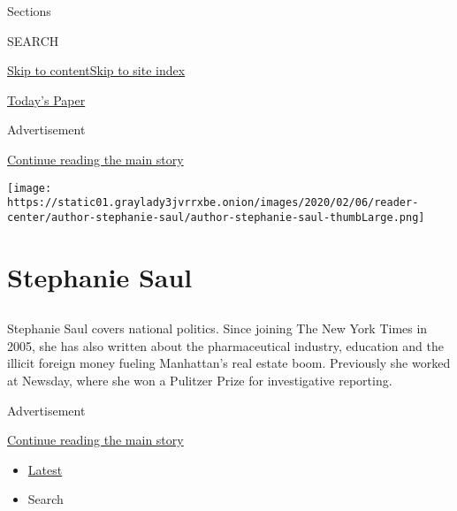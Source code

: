 Sections

SEARCH

\protect\hyperlink{site-content}{Skip to
content}\protect\hyperlink{site-index}{Skip to site index}

\href{https://myaccount.nytimes3xbfgragh.onion/auth/login?response_type=cookie\&client_id=vi}{}

\href{https://www.nytimes3xbfgragh.onion/section/todayspaper}{Today's
Paper}

Advertisement

\protect\hyperlink{after-top}{Continue reading the main story}

\texttt{[image: https://static01.graylady3jvrrxbe.onion/images/2020/02/06/reader-center/author-stephanie-saul/author-stephanie-saul-thumbLarge.png]}

\hypertarget{stephanie-saul}{%
\section{Stephanie Saul}\label{stephanie-saul}}

\subsection{}

Stephanie Saul covers national politics. Since joining The New York
Times in 2005, she has also written about the pharmaceutical industry,
education and the illicit foreign money fueling Manhattan's real estate
boom. Previously she worked at Newsday, where she won a Pulitzer Prize
for investigative reporting.

Advertisement

\protect\hyperlink{after-mid1}{Continue reading the main story}

\begin{itemize}
\tightlist
\item
  \protect\hyperlink{stream-panel}{Latest}
\item
  Search
\end{itemize}

